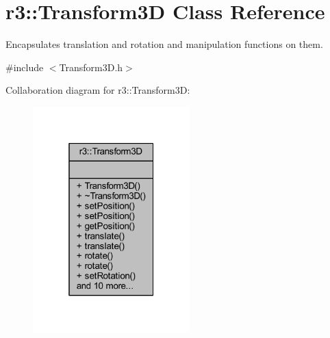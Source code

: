 \hypertarget{classr3_1_1_transform3_d}{}\section{r3\+:\+:Transform3D Class Reference}
\label{classr3_1_1_transform3_d}


Encapsulates translation and rotation and manipulation functions on them.  




{\ttfamily \#include $<$Transform3\+D.\+h$>$}



Collaboration diagram for r3\+:\+:Transform3D\+:\nopagebreak
\begin{figure}[H]
\begin{center}
\leavevmode
\includegraphics[width=172pt]{classr3_1_1_transform3_d__coll__graph}
\end{center}
\end{figure}
